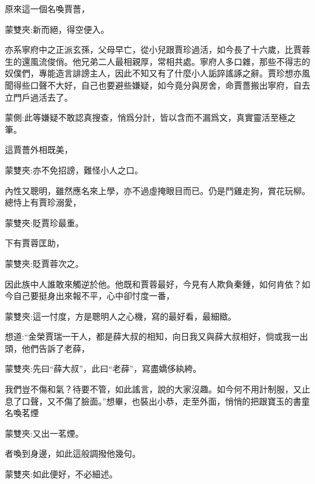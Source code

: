 \begin{parag}
    原來這一個名喚賈薔，\begin{note}蒙雙夾:新而絕，得空便入。\end{note}亦系寧府中之正派玄孫，父母早亡，從小兒跟賈珍過活，如今長了十六歲，比賈蓉生的還風流俊俏。他兄弟二人最相親厚，常相共處。寧府人多口雜，那些不得志的奴僕們，專能造言誹謗主人，因此不知又有了什麼小人詬誶謠諑之辭。賈珍想亦風聞得些口聲不大好，自己也要避些嫌疑，如今竟分與房舍，命賈薔搬出寧府，自去立門戶過活去了。\begin{note}蒙側:此等嫌疑不敢認真搜查，悄爲分計，皆以含而不漏爲文，真實靈活至極之筆。\end{note}這賈薔外相既美，\begin{note}蒙雙夾:亦不免招謗，難怪小人之口。\end{note}內性又聰明，雖然應名來上學，亦不過虛掩眼目而已。仍是鬥雞走狗，賞花玩柳。總恃上有賈珍溺愛，\begin{note}蒙雙夾:貶賈珍最重。\end{note}下有賈蓉匡助，\begin{note}蒙雙夾:貶賈蓉次之。\end{note}因此族中人誰敢來觸逆於他。他既和賈蓉最好，今見有人欺負秦鍾，如何肯依？如今自己要挺身出來報不平，心中卻忖度一番，\begin{note}蒙雙夾:這一忖度，方是聰明人之心機，寫的最好看，最細緻。\end{note}想道:“金榮賈瑞一干人，都是薛大叔的相知，向日我又與薛大叔相好，倘或我一出頭，他們告訴了老薛，\begin{note}蒙雙夾:先曰“薛大叔”，此曰“老薛”，寫盡嬌侈紈絝。\end{note}我們豈不傷和氣？待要不管，如此謠言，說的大家沒趣。如今何不用計制服，又止息了口聲，又不傷了臉面。”想畢，也裝出小恭，走至外面，悄悄的把跟寶玉的書童名喚茗煙\begin{note}蒙雙夾:又出一茗煙。\end{note}者喚到身邊，如此這般調撥他幾句。\begin{note}蒙雙夾:如此便好，不必細述。\end{note}
\end{parag}


